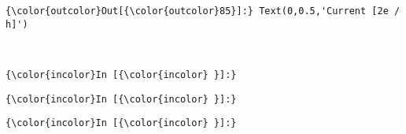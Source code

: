 \documentclass[11pt]{article}
\begin{document}
\begin{Verbatim}[commandchars=\\\{\}]
{\color{outcolor}Out[{\color{outcolor}85}]:} Text(0,0.5,'Current [2e / h]')
\end{Verbatim}
            
    \begin{center}
    \end{center}
    { \hspace*{\fill} \\}
    
    \begin{Verbatim}[commandchars=\\\{\}]
{\color{incolor}In [{\color{incolor} }]:} 
\end{Verbatim}


    \begin{Verbatim}[commandchars=\\\{\}]
{\color{incolor}In [{\color{incolor} }]:} 
\end{Verbatim}


    \begin{Verbatim}[commandchars=\\\{\}]
{\color{incolor}In [{\color{incolor} }]:} 
\end{Verbatim}
\end{document}
